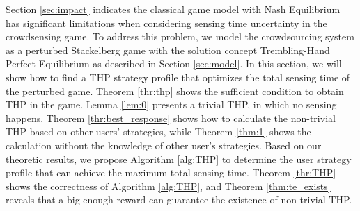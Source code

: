 \documentclass{IEEEtran}
\begin{document}
Section \ref{sec:impact} indicates the classical game model with Nash Equilibrium has significant limitations when considering sensing {\color{black}time} uncertainty in the crowdsensing game. To address this problem, we model the crowdsourcing system as a perturbed Stackelberg game with the solution concept Trembling-Hand Perfect Equilibrium as described in Section \ref{sec:model}. In this section, we will show how to find a THP strategy profile that optimizes the total sensing time of the perturbed game. Theorem \ref{thr:thp} shows the sufficient condition to obtain THP in the game. Lemma \ref{lem:0} presents a trivial THP, in which no sensing happens. Theorem \ref{thr:best_response} shows how to calculate the non-trivial THP based on other users\rq{} strategies, while Theorem \ref{thm:1} shows the calculation without the knowledge of other user\rq{}s strategies. Based on our theoretic results, we propose Algorithm \ref{alg:THP} to determine the user strategy profile that can achieve the maximum total sensing time. Theorem \ref{thr:THP} shows the correctness of Algorithm \ref{alg:THP}, and Theorem \ref{thm:te_exists} reveals that a big enough reward can guarantee the existence of non-trivial THP.
\end{document}
